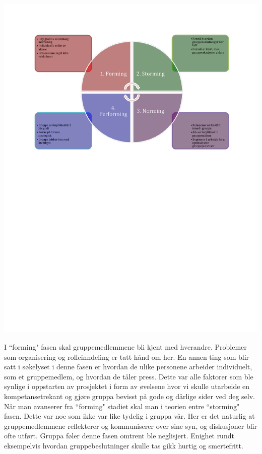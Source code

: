 \begin{center}
\includegraphics[scale=0.9,
trim=2.7cm 14cm 0cm 5cm]{Faserigruppesamarbeid.pdf}
\label{fig:faserigruppesamarbeid}
\end{center}

I ``forming" fasen skal gruppemedlemmene bli kjent med hverandre. Problemer som organisering og rolleinndeling er tatt hånd om her. En annen ting som blir satt i søkelyset i denne fasen er hvordan de ulike personene arbeider individuelt, som et gruppemedlem, og hvordan de tåler press. Dette var alle faktorer som ble synlige i oppstarten av prosjektet i form av øvelsene hvor vi skulle utarbeide en kompetansetrekant og gjøre gruppa bevisst på gode og dårlige sider ved deg selv.\\

Når man avanserer fra ``forming" stadiet skal man i teorien entre ``storming" fasen. Dette var noe som ikke var like tydelig i gruppa vår. Her er det naturlig at gruppemedlemmene reflekterer og kommuniserer over sine syn, og diskusjoner blir ofte utført. Gruppa føler denne fasen omtrent ble neglisjert. Enighet rundt eksempelvis hvordan gruppebeslutninger skulle tas gikk hurtig og smertefritt.\\

